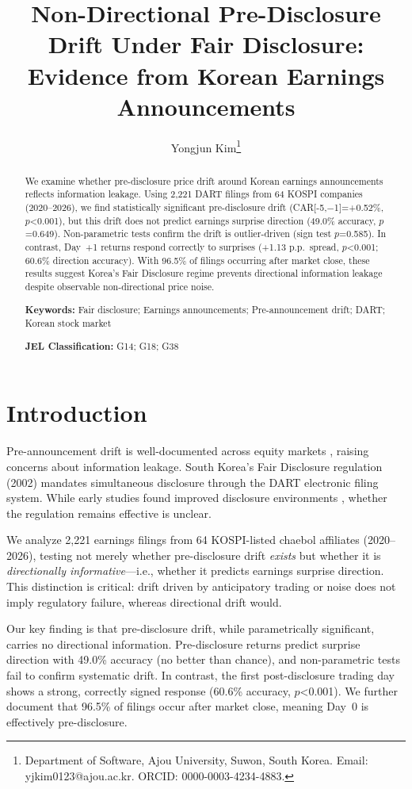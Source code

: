 \documentclass[12pt,a4paper]{article}
\title{Non-Directional Pre-Disclosure Drift Under Fair Disclosure: Evidence from Korean Earnings Announcements}
\author{Yongjun Kim\thanks{Department of Software, Ajou University, Suwon, South Korea. Email: yjkim0123@ajou.ac.kr. ORCID: 0000-0003-4234-4883.}}
\date{}
\begin{document}
\maketitle

\begin{abstract}
\noindent We examine whether pre-disclosure price drift around Korean earnings announcements reflects information leakage. Using 2,221 DART filings from 64 KOSPI companies (2020--2026), we find statistically significant pre-disclosure drift (CAR[-5,$-$1]=+0.52\%, $p$<0.001), but this drift does not predict earnings surprise direction (49.0\% accuracy, $p$=0.649). Non-parametric tests confirm the drift is outlier-driven (sign test $p$=0.585). In contrast, Day~+1 returns respond correctly to surprises (+1.13 p.p.\ spread, $p$<0.001; 60.6\% direction accuracy). With 96.5\% of filings occurring after market close, these results suggest Korea's Fair Disclosure regime prevents directional information leakage despite observable non-directional price noise.

\medskip
\noindent\textbf{Keywords:} Fair disclosure; Earnings announcements; Pre-announcement drift; DART; Korean stock market

\medskip
\noindent\textbf{JEL Classification:} G14; G18; G38
\end{abstract}

\section{Introduction}

Pre-announcement drift is well-documented across equity markets \citep{kaniel2012individual}, raising concerns about information leakage. South Korea's Fair Disclosure regulation (2002) mandates simultaneous disclosure through the DART electronic filing system. While early studies found improved disclosure environments \citep{yun2012fair, park2020disclosure}, whether the regulation remains effective is unclear.

We analyze 2,221 earnings filings from 64 KOSPI-listed chaebol affiliates (2020--2026), testing not merely whether pre-disclosure drift \textit{exists} but whether it is \textit{directionally informative}---i.e., whether it predicts earnings surprise direction. This distinction is critical: drift driven by anticipatory trading or noise does not imply regulatory failure, whereas directional drift would.

Our key finding is that pre-disclosure drift, while parametrically significant, carries no directional information. Pre-disclosure returns predict surprise direction with 49.0\% accuracy (no better than chance), and non-parametric tests fail to confirm systematic drift. In contrast, the first post-disclosure trading day shows a strong, correctly signed response (60.6\% accuracy, $p$<0.001). We further document that 96.5\% of filings occur after market close, meaning Day~0 is effectively pre-disclosure.
\end{document}

